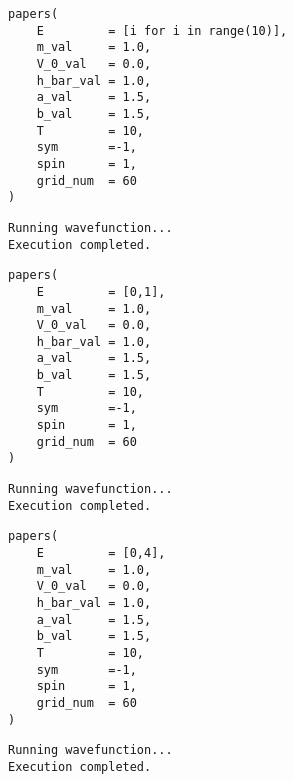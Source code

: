 \documentclass[11pt]{article}
\begin{document}
\begin{verbatim}
papers(
    E         = [i for i in range(10)],
    m_val     = 1.0,
    V_0_val   = 0.0,
    h_bar_val = 1.0,
    a_val     = 1.5,
    b_val     = 1.5,
    T         = 10,
    sym       =-1,
    spin      = 1,
    grid_num  = 60
)
\end{verbatim}

\label{orgb256c18}
\begin{verbatim}
Running wavefunction...
Execution completed.
\end{verbatim}

\begin{center}

\end{center}


\begin{verbatim}
papers(
    E         = [0,1],
    m_val     = 1.0,
    V_0_val   = 0.0,
    h_bar_val = 1.0,
    a_val     = 1.5,
    b_val     = 1.5,
    T         = 10,
    sym       =-1,
    spin      = 1,
    grid_num  = 60
)
\end{verbatim}

\label{org9e641f2}
\begin{verbatim}
Running wavefunction...
Execution completed.
\end{verbatim}

\begin{center}

\end{center}

\begin{verbatim}
papers(
    E         = [0,4],
    m_val     = 1.0,
    V_0_val   = 0.0,
    h_bar_val = 1.0,
    a_val     = 1.5,
    b_val     = 1.5,
    T         = 10,
    sym       =-1,
    spin      = 1,
    grid_num  = 60
)
\end{verbatim}

\label{orgb8ce585}
\begin{verbatim}
Running wavefunction...
Execution completed.
\end{verbatim}

\begin{center}

\end{center}
\end{document}
